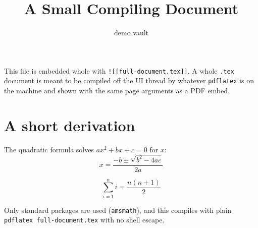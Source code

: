\documentclass{article}
\title{A Small Compiling Document}
\author{demo vault}
\date{}
\begin{document}
\maketitle

This file is embedded whole with \verb|![[full-document.tex]]|. A whole \texttt{.tex} document is meant
to be compiled off the UI thread by whatever \texttt{pdflatex} is on the
machine and shown with the same page arguments as a PDF embed.

\section{A short derivation}

The quadratic formula solves $ax^2 + bx + c = 0$ for $x$:
\[
  x = \frac{-b \pm \sqrt{b^2 - 4ac}}{2a}
\]

\begin{equation}
  \sum_{i=1}^{n} i = \frac{n(n+1)}{2}
\end{equation}

Only standard packages are used (\texttt{amsmath}), and this compiles with
plain \texttt{pdflatex full-document.tex} with no shell escape.
\end{document}
